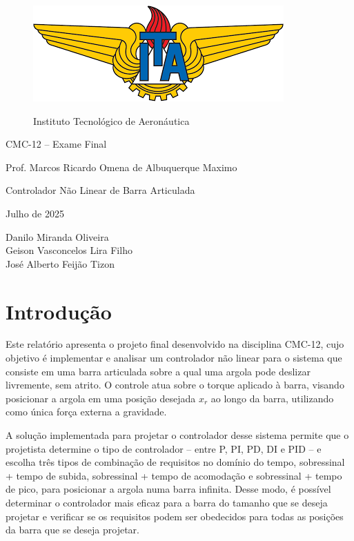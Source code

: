 \documentclass[a4paper, 12pt]{article}
\begin{document}
 
\thispagestyle{empty} 
\vspace*{2.15cm}

\begin{figure}[htb]
    \centering
    \includegraphics[scale=0.52]{images/ITA.png}
    
    \large Instituto Tecnológico de Aeronáutica
\end{figure}

\begin{center}
    \huge{CMC-12 – Exame Final} 
    
    \vspace{.5cm}
    \large Prof. Marcos Ricardo Omena de Albuquerque Maximo
    
    \vspace{1cm}
    \Huge Controlador Não Linear de Barra Articulada
    
    \vspace{.5cm}
    \Large Julho de 2025
    
    \vspace{.15cm}
    \large
    Danilo Miranda Oliveira \\
    Geison Vasconcelos Lira Filho \\
    José Alberto Feijão Tizon \\
\end{center}

\newpage
\setcounter{page}{1}


\section{Introdução}

Este relatório apresenta o projeto final desenvolvido na disciplina CMC-12, cujo objetivo é implementar e analisar um controlador não linear para o sistema que consiste em uma barra articulada sobre a qual uma argola pode deslizar livremente, sem atrito. O controle atua sobre o torque aplicado à barra, visando posicionar a argola em uma posição desejada \( x_r \) ao longo da barra, utilizando como única força externa a gravidade.

A solução implementada para projetar o controlador desse sistema permite que o projetista determine o tipo de controlador -- entre P, PI, PD, DI e PID -- e escolha três tipos de combinação de requisitos no domínio do tempo, sobressinal + tempo de subida, sobressinal + tempo de acomodação e sobressinal + tempo de pico, para posicionar a argola numa barra infinita. Desse modo, é possível determinar o controlador mais eficaz para a barra do tamanho que se deseja projetar e verificar se os requisitos podem ser obedecidos para todas as posições da barra que se deseja projetar.
\end{document}

